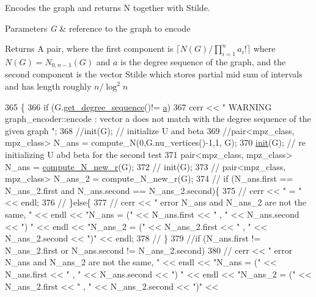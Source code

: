 Encodes the graph and returns N together with Stilde. 


\begin{DoxyParams}{Parameters}
{\em G} & reference to the graph to encode \\
\hline
\end{DoxyParams}
\begin{DoxyReturn}{Returns}
A pair, where the first component is $\lceil N(G) / \prod_{i=1}^n a_i! \rceil$ where $N(G) = N_{0,n-1}(G)$ and $a$ is the degree sequence of the graph, and the second component is the vector Stilde which stores partial mid sum of intervals and has length roughly $n / \log^2 n$ 
\end{DoxyReturn}

\begin{DoxyCode}
365                                                                  \{
366   \textcolor{keywordflow}{if} (G.\hyperlink{classgraph_afdca627df7fb93a7d1d8a547f616e948}{get\_degree\_sequence}()!= \hyperlink{classgraph__encoder_a56eb5cf480ae5c2fca9f3a45f2ffd4f1}{a})
367     cerr << \textcolor{stringliteral}{" WARNING graph\_encoder::encode : vector a does not match with the degree sequence of the given
       graph "};
368   \textcolor{comment}{//init(G); // initialize U and beta }
369   \textcolor{comment}{//pair<mpz\_class, mpz\_class> N\_ans  = compute\_N(0,G.nu\_vertices()-1,1, G);}
370   \hyperlink{classgraph__encoder_a6cfb6fca4bc50d4e5d267060a91f43c3}{init}(G); \textcolor{comment}{// re initializing U abd beta for the second test}
371   pair<mpz\_class, mpz\_class> N\_ans = \hyperlink{classgraph__encoder_a0f53e165b1206e4ac0f36cf311e97baf}{compute\_N\_new\_r}(G);
372   \textcolor{comment}{// init(G);}
373   \textcolor{comment}{// pair<mpz\_class, mpz\_class> N\_ans\_2 = compute\_N\_new\_r(G);}
374   \textcolor{comment}{// if (N\_ans.first == N\_ans\_2.first and N\_ans.second == N\_ans\_2.second)\{}
375   \textcolor{comment}{//   cerr << " = " << endl;}
376   \textcolor{comment}{// \}else\{}
377   \textcolor{comment}{//   cerr << " error N\_ans and N\_ans\_2 are not the same, "  << endl << "N\_ans = (" << N\_ans.first << " ,
       " << N\_ans.second << ") " << endl << "N\_ans\_2 = (" << N\_ans\_2.first << " , " << N\_ans\_2.second << ")" <<
       endl; }
378   \textcolor{comment}{// \}}
379   \textcolor{comment}{//if (N\_ans.first != N\_ans\_2.first or N\_ans.second != N\_ans\_2.second)}
380   \textcolor{comment}{//  cerr << " error N\_ans and N\_ans\_2 are not the same, "  << endl << "N\_ans = (" << N\_ans.first << " , "
       << N\_ans.second << ") " << endl << "N\_ans\_2 = (" << N\_ans\_2.first << " , " << N\_ans\_2.second << ")" <<
}
\end{DoxyCode}
